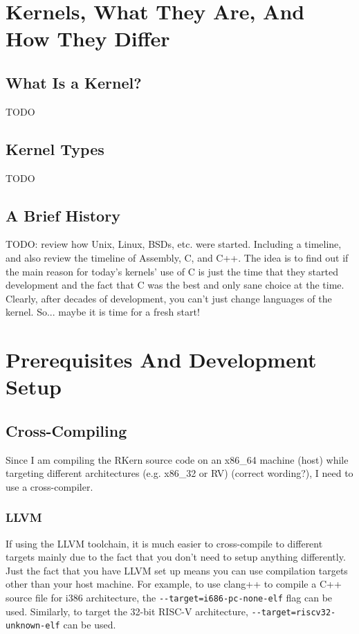\documentclass[a4paper,12pt,twoside]{report}
\begin{document}
    \chapter{Kernels, What They Are, And How They Differ}

	    \section{What Is a Kernel?}
	    	TODO

	    \section{Kernel Types}
	    	TODO

	    \section{A Brief History}
	        TODO: review how Unix, Linux, BSDs, etc. were started. Including a timeline, and also review the timeline of Assembly, C, and C++. The idea is to find out if the main reason for today's kernels' use of C is just the time that they started development and the fact that C was the best and only sane choice at the time. Clearly, after decades of development, you can't just change languages of the kernel. So... maybe it is time for a fresh start!

    \chapter{Prerequisites And Development Setup}

	    \section{Cross-Compiling}
	        Since I am compiling the RKern source code on an x86\_64 machine (host) while targeting different architectures (e.g. x86\_32 or RV) (correct wording?), I need to use a cross-compiler.

	        \subsection{LLVM}
	        If using the LLVM toolchain, it is much easier to cross-compile to different targets mainly due to the fact that you don't need to setup anything differently. Just the fact that you have LLVM set up means you can use compilation targets other than your host machine.
	        For example, to use clang++ to compile a C++ source file for i386 architecture, the \verb|--target=i686-pc-none-elf| flag can be used. Similarly, to target the 32-bit RISC-V architecture, \verb|--target=riscv32-unknown-elf| can be used.
\end{document}
